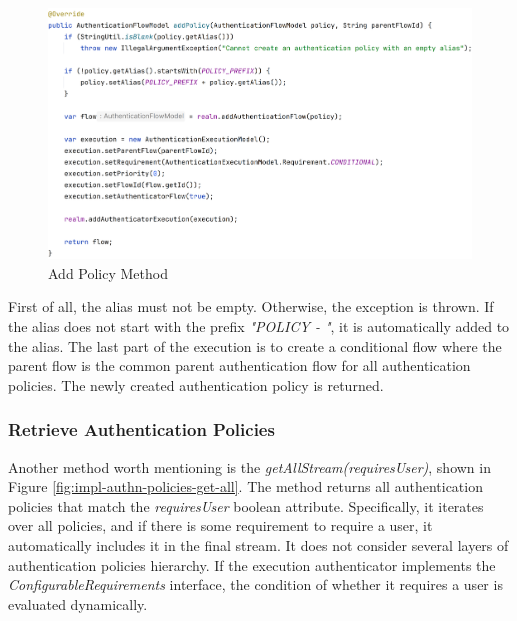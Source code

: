 \begin{figure}[htbp]
  \centering
  \includegraphics[width=1.05\textwidth]{img/sections/6-implementation/authnPolicyAddPolicy.png}
  \caption{Add Policy Method}
  \label{fig:impl-authn-policies-add-policy-diagram}
\end{figure}

First of all, the alias must not be empty.
Otherwise, the exception is thrown.
If the alias does not start with the prefix \textit{"POLICY - "}, it is automatically added to the alias.
The last part of the execution is to create a conditional flow where the parent flow is the common parent authentication flow for all authentication policies.
The newly created authentication policy is returned.

\newpage

\subsubsection{Retrieve Authentication Policies}

Another method worth mentioning is the \textit{getAllStream(requiresUser)}, shown in Figure \ref{fig:impl-authn-policies-get-all}.
The method returns all authentication policies that match the \textit{requiresUser} boolean attribute.
Specifically, it iterates over all policies, and if there is some requirement to require a user, it automatically includes it in the final stream.
It does not consider several layers of authentication policies hierarchy.
If the execution authenticator implements the \textit{ConfigurableRequirements} interface, the condition of whether it requires a user is evaluated dynamically.

